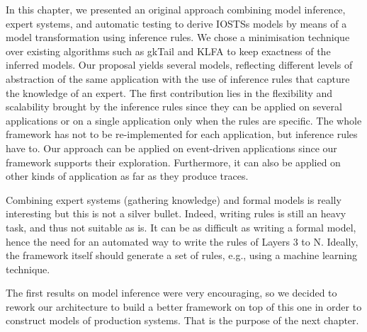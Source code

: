 In this chapter, we presented an original approach combining
model inference, expert systems, and automatic testing to derive
IOSTSs models by means of a model transformation using inference
rules.  We chose a minimisation technique over existing
algorithms such as gkTail and KLFA to keep exactness of the
inferred models. Our proposal yields several models, reflecting
different levels of abstraction of the same application with the
use of inference rules that capture the knowledge of an expert.
The first contribution lies in the flexibility and scalability
brought by the inference rules since they can be applied on
several applications or on a single application only when the
rules are specific. The whole framework has not to be
re-implemented for each application, but inference rules have to.
Our approach can be applied on event-driven applications since
our framework supports their exploration. Furthermore, it can
also be applied on other kinds of application as far as they
produce traces.

Combining expert systems (gathering knowledge) and formal models
is really interesting but this is not a silver bullet. Indeed,
writing rules is still an heavy task, and thus not suitable as
is. It can be as difficult as writing a formal model, hence the
need for an automated way to write the rules of Layers 3 to N.
Ideally, the framework itself should generate a set of rules,
e.g., using a machine learning technique.

The first results on model inference were very encouraging, so we
decided to rework our architecture to build a better framework on
top of this one in order to construct models of production
systems. That is the purpose of the next chapter.
